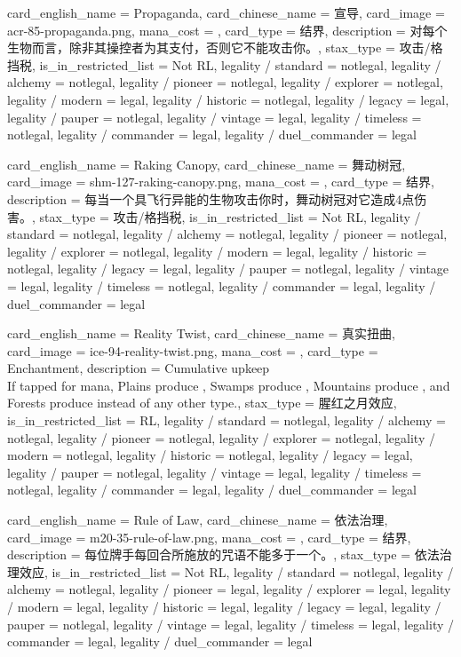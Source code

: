 \documentclass[lang = cn, color = black, 10pt]{AllThatStax}
\begin{document}
\card
{
	card_english_name = {Propaganda},
	card_chinese_name = {宣导},
	card_image = acr-85-propaganda.png,
	mana_cost = ,
	card_type = 结界,
	description = {对每个生物而言，除非其操控者为其支付，否则它不能攻击你。},
	stax_type = 攻击/格挡税,
	is_in_restricted_list = Not RL,
	legality / standard = notlegal,
	legality / alchemy = notlegal,
	legality / pioneer = notlegal,
	legality / explorer = notlegal,
	legality / modern = legal,
	legality / historic = notlegal,
	legality / legacy = legal,
	legality / pauper = notlegal,
	legality / vintage = legal,
	legality / timeless = notlegal,
	legality / commander = legal,
	legality / duel_commander = legal
}

\card
{
	card_english_name = {Raking Canopy},
	card_chinese_name = {舞动树冠},
	card_image = shm-127-raking-canopy.png,
	mana_cost = ,
	card_type = 结界,
	description = {每当一个具飞行异能的生物攻击你时，舞动树冠对它造成4点伤害。},
	stax_type = 攻击/格挡税,
	is_in_restricted_list = Not RL,
	legality / standard = notlegal,
	legality / alchemy = notlegal,
	legality / pioneer = notlegal,
	legality / explorer = notlegal,
	legality / modern = legal,
	legality / historic = notlegal,
	legality / legacy = legal,
	legality / pauper = notlegal,
	legality / vintage = legal,
	legality / timeless = notlegal,
	legality / commander = legal,
	legality / duel_commander = legal
}

\card
{
	card_english_name = {Reality Twist},
	card_chinese_name = {真实扭曲},
	card_image = ice-94-reality-twist.png,
	mana_cost = ,
	card_type = Enchantment,
	description = {Cumulative upkeep  \\
		If tapped for mana, Plains produce , Swamps produce , Mountains produce , and Forests produce  instead of any other type.},
	stax_type = 腥红之月效应,
	is_in_restricted_list = RL,
	legality / standard = notlegal,
	legality / alchemy = notlegal,
	legality / pioneer = notlegal,
	legality / explorer = notlegal,
	legality / modern = notlegal,
	legality / historic = notlegal,
	legality / legacy = legal,
	legality / pauper = notlegal,
	legality / vintage = legal,
	legality / timeless = notlegal,
	legality / commander = legal,
	legality / duel_commander = legal
}

\card
{
	card_english_name = {Rule of Law},
	card_chinese_name = {依法治理},
	card_image = m20-35-rule-of-law.png,
	mana_cost = ,
	card_type = 结界,
	description = {每位牌手每回合所施放的咒语不能多于一个。},
	stax_type = 依法治理效应,
	is_in_restricted_list = Not RL,
	legality / standard = notlegal,
	legality / alchemy = notlegal,
	legality / pioneer = legal,
	legality / explorer = legal,
	legality / modern = legal,
	legality / historic = legal,
	legality / legacy = legal,
	legality / pauper = notlegal,
	legality / vintage = legal,
	legality / timeless = legal,
	legality / commander = legal,
	legality / duel_commander = legal
}
\end{document}
